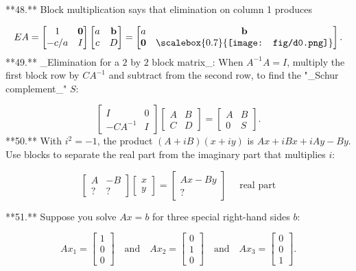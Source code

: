 

**48.** Block multiplication says that elimination on column 1 produces

\[EA=\begin{bmatrix}1&\textbf{0}\\ -c/a&I\end{bmatrix}\begin{bmatrix}a&\textbf{b}\\ c&D\end{bmatrix}=\begin{bmatrix}a&\textbf{b}\\ \textbf{0}&\scalebox{0.7}{\texttt{[image: fig/d0.png]}}\end{bmatrix}.\]
**49.** _Elimination for a \(2\) by \(2\) block matrix_: When \(A^{-1}A=I\), multiply the first block row by \(CA^{-1}\) and subtract from the second row, to find the "_Schur complement_" \(S\):

\[\begin{bmatrix}I&0\\ -CA^{-1}&I\end{bmatrix}\begin{bmatrix}A&B\\ C&D\end{bmatrix}=\begin{bmatrix}A&B\\ 0&S\end{bmatrix}.\]
**50.** With \(i^{2}=-1\), the product \((A+iB)(x+iy)\) is \(Ax+iBx+iAy-By\). Use blocks to separate the real part from the imaginary part that multiplies \(i\):

\[\begin{bmatrix}A&-B\\ ?&?\end{bmatrix}\begin{bmatrix}x\\ y\end{bmatrix}=\begin{bmatrix}Ax-By\\ ?\end{bmatrix}\quad\text{ real part}\]

**51.** Suppose you solve \(Ax=b\) for three special right-hand sides \(b\):

\[Ax_{1}=\begin{bmatrix}1\\ 0\\ 0\end{bmatrix}\quad\text{and}\quad Ax_{2}=\begin{bmatrix}0\\ 1\\ 0\end{bmatrix}\quad\text{and}\quad Ax_{3}=\begin{bmatrix}0\\ 0\\ 1\end{bmatrix}.\]

